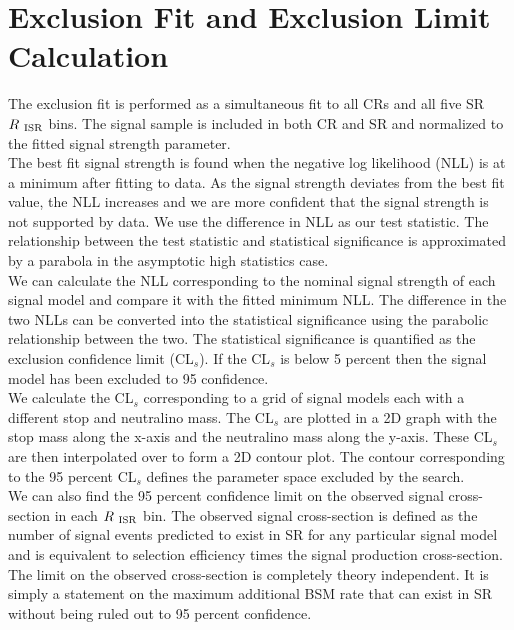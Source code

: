 \section{Exclusion Fit and Exclusion Limit Calculation}
\label{sec:stat:limit}

\indent The exclusion fit is performed as a simultaneous fit to all CRs and all five SR $R_{~\mathrm{ISR}}$ bins. The signal sample is included in both CR and SR and normalized to the fitted signal strength parameter.   \\

\indent The best fit signal strength is found when the negative log likelihood (NLL) is at a minimum after fitting to data.  As the signal strength deviates from the best fit value, the NLL increases and we are more confident that the signal strength is not supported by data.  We use the difference in NLL as our test statistic.  The relationship between the test statistic and statistical significance is approximated by a parabola in the asymptotic high statistics case. \\

\indent We can calculate the NLL corresponding to the nominal signal strength of each signal model and compare it with the fitted minimum NLL.  The difference in the two NLLs can be converted into the statistical significance using the parabolic relationship between the two.  The statistical significance is quantified as the exclusion confidence limit (CL$_s$).  If the CL$_s$ is below 5 percent then the signal model has been excluded to 95 confidence. \\

\indent We calculate the CL$_s$ corresponding to a grid of signal models each with a different stop and neutralino mass.  The CL$_s$ are plotted in a 2D graph with the stop mass along the x-axis and the neutralino mass along the y-axis.  These CL$_s$ are then interpolated over to form a 2D contour plot.  The contour corresponding to the 95 percent CL$_s$ defines the parameter space excluded by the search. \\

\indent We can also find the 95 percent confidence limit on the observed signal cross-section in each $R_{~\mathrm{ISR}}$ bin.  The observed signal cross-section is defined as the number of signal events predicted to exist in SR for any particular signal model and is equivalent to selection efficiency times the signal production cross-section.  The limit on the observed cross-section is completely theory independent.  It is simply a statement on the maximum additional BSM rate that can exist in SR without being ruled out to 95 percent confidence.  \\

